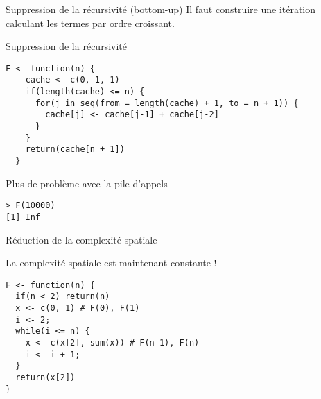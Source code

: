\documentclass[10pt]{beamer}
\newcommand{\F}[1]{\ensuremath{{\cal F}_{#1}}\xspace}
\begin{document}
\begin{frame}[fragile]{Suppression de la récursivité (bottom-up)}
  Il faut construire une itération calculant les termes par ordre croissant.
  \begin{alertblock}{Suppression de la récursivité}
    \begin{lstlisting}[style=edblock]
F <- function(n) {
    cache <- c(0, 1, 1)
    if(length(cache) <= n) {
      for(j in seq(from = length(cache) + 1, to = n + 1)) {
        cache[j] <- cache[j-1] + cache[j-2]
      }
    }
    return(cache[n + 1])
  }
    \end{lstlisting}
  \end{alertblock}


  \begin{exampleblock}{Plus de problème avec la pile d'appels}
    \begin{lstlisting}[style=block]
> F(10000)
[1] Inf
    \end{lstlisting}
  \end{exampleblock}

\end{frame}


\begin{frame}[fragile]{Réduction de la complexité spatiale}

    \begin{center}
\end{center}
\begin{alertblock}{La complexité spatiale est maintenant constante !}


    \begin{lstlisting}[style=edblock]
F <- function(n) {
  if(n < 2) return(n)
  x <- c(0, 1) # F(0), F(1)
  i <- 2;
  while(i <= n) {
    x <- c(x[2], sum(x)) # F(n-1), F(n)
    i <- i + 1;
  }
  return(x[2])
}
\end{lstlisting}
\end{alertblock}%
\end{frame}
\end{document}
